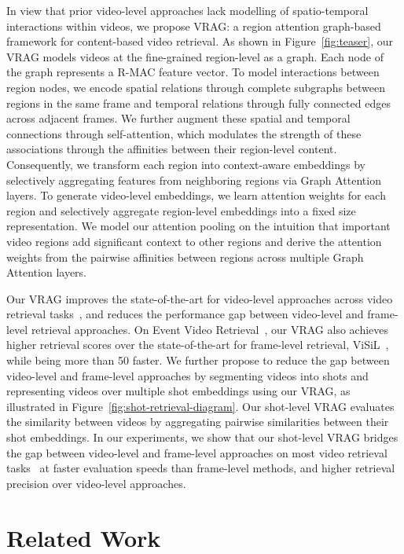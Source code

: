 \documentclass[letterpaper]{article} \usepackage{aaai22}  \usepackage{times}  \usepackage{helvet}  \usepackage{courier}  \usepackage[hyphens]{url}  \usepackage{graphicx} \urlstyle{rm} \usepackage{amsmath}
\begin{document}
In view that prior video-level approaches lack modelling of spatio-temporal interactions within videos, we propose VRAG: a region attention graph-based framework for content-based video retrieval. As shown in Figure~\ref{fig:teaser}, our VRAG models videos at the fine-grained region-level as a graph. Each node of the graph represents a R-MAC feature vector. To model interactions between region nodes, we encode spatial relations through complete subgraphs between regions in the same frame and temporal relations through fully connected edges across adjacent frames. We further augment these spatial and temporal connections through self-attention, which modulates the strength of these associations through the affinities between their region-level content. Consequently, we transform each region into context-aware embeddings by selectively aggregating features from neighboring regions via Graph Attention~\cite{graph-attention} layers. To generate video-level embeddings, we learn attention weights for each region and selectively aggregate region-level embeddings into a fixed size representation. We model our attention pooling on the intuition that important video regions add significant context to other regions and derive the attention weights from the pairwise affinities between regions across multiple Graph Attention layers. 

Our VRAG improves the state-of-the-art for video-level approaches across video retrieval tasks~\cite{dataset:fivr200k, dataset:evve, dataset:cc-web-video}, and reduces the performance gap between video-level and frame-level retrieval approaches. On Event Video Retrieval~\cite{dataset:evve}, our VRAG also achieves higher retrieval scores over the state-of-the-art for frame-level retrieval, ViSiL~\cite{kordopatiszilos2019visil}, while being more than 50 faster. We further propose to reduce the gap between video-level and frame-level approaches by segmenting videos into shots and representing videos over multiple shot embeddings using our VRAG, as illustrated in Figure~\ref{fig:shot-retrieval-diagram}. Our shot-level VRAG evaluates the similarity between videos by aggregating pairwise similarities between their shot embeddings. In our experiments, we show that our shot-level VRAG bridges the gap between video-level and frame-level approaches on most video retrieval tasks~\cite{dataset:fivr200k, dataset:cc-web-video}
at faster evaluation speeds than frame-level methods, and higher retrieval precision over video-level approaches. 

\section{Related Work}
\end{document}
